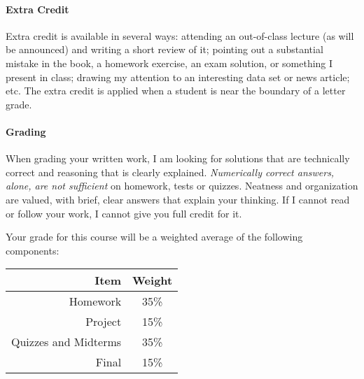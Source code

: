 \documentclass[11pt]{article}
\begin{document}
\paragraph{Extra Credit}
Extra credit is available in several ways: attending an out-of-class lecture (as will be announced) and writing a short review of it; pointing out a substantial mistake in the book, a homework exercise, an exam solution, or something I present in class; drawing my attention to an interesting data set or news article; etc. The extra credit is applied when a student is near the boundary of a letter grade.

\paragraph{Grading}
When grading your written work, I am looking for solutions that are technically correct and reasoning that is clearly explained.  \emph{Numerically correct answers, alone, are not sufficient} on homework, tests or quizzes.  Neatness and organization are valued, with brief, clear answers that explain your thinking.  If I cannot read or follow your work, I cannot give you full credit for it.

Your grade for this course will be a weighted average of the following components:


\begin{table}[!h]
\centering
\begin{tabular}{r c}
\toprule
Item & Weight \\
\midrule
Homework & 35\% \\
\cmidrule(r){1-2}
Project & 15\% \\
\cmidrule(r){1-2}
Quizzes and Midterms & 35\% \\
\cmidrule(r){1-2}
Final & 15\% \\
\bottomrule
\end{tabular}
\end{table}
\end{document}
